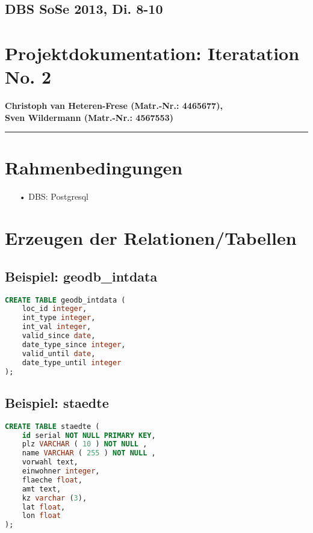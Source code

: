 \documentclass[11pt,a4paper,DIV=10,]{scrartcl}
\begin{document}

\subsection*{DBS SoSe 2013, Di. 8-10}
\section*{Projektdokumentation: Iteratation No. 2}
\textbf{Christoph van Heteren-Frese (Matr.-Nr.: 4465677), \\ Sven Wildermann (Matr.-Nr.: 4567553) }
\hrule
\section*{Rahmenbedingungen}
\begin{enumerate}
\item[•] DBS: Postgresql
\end{enumerate}
\section*{Erzeugen der Relationen/Tabellen}

\subsection*{Beispiel: geodb\_intdata}
\begin{lstlisting}[language=sql]
CREATE TABLE geodb_intdata (
    loc_id integer,
    int_type integer,
    int_val integer,
    valid_since date,
    date_type_since integer,
    valid_until date,
    date_type_until integer
);
\end{lstlisting}
\subsection*{Beispiel: staedte}
\begin{lstlisting}[language=sql]
CREATE TABLE staedte (
	id serial NOT NULL PRIMARY KEY,
	plz VARCHAR ( 10 ) NOT NULL ,
	name VARCHAR ( 255 ) NOT NULL ,
	vorwahl text,	
	einwohner integer,
	flaeche float,
	amt text, 
	kz varchar (3),
	lat float,
	lon float
);
\end{lstlisting}
\end{document}
